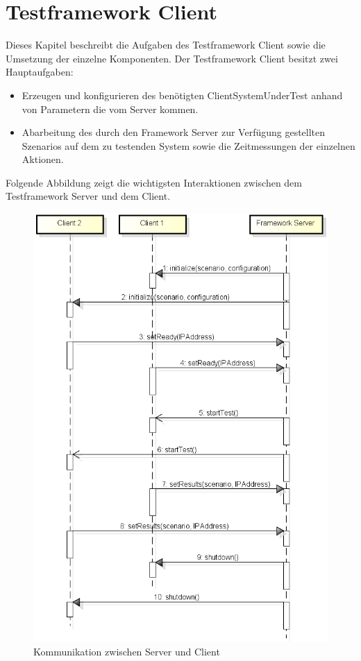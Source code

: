 \section{Testframework Client}
\label{sec:test-FW Client}
Dieses Kapi\-tel beschreibt die Aufgaben des Testframework Client sowie die Umsetzung der einzelne Komponenten. Der Testframework Client besitzt zwei Hauptaufgaben:
\begin{itemize}
\item Erzeugen und konfigurieren des benötigten ClientSystemUnderTest anhand von Parametern die vom Server kommen.
\item Abarbeitung des durch den Framework Server zur Verfügung gestellten Szenarios auf dem zu testenden System sowie die Zeitmessungen der einzelnen Aktionen.
\end{itemize}
Folgende Abbildung zeigt die wichtigsten Interaktionen zwischen dem Test\-framework Server und dem Client.
\begin{figure}[H]
\begin{center}
\includegraphics[scale=0.6]{image_testFramework/Server_Client_Communication.png}
\end{center}
\caption{Kommunikation zwischen Server und Client}
\end{figure}

